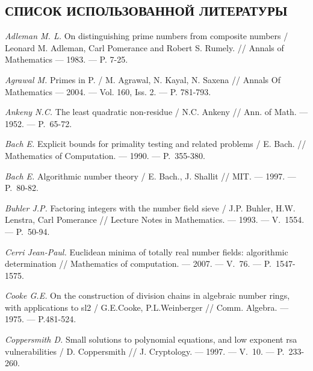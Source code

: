 \newpage
\begin{center}
    \section*{СПИСОК ИСПОЛЬЗОВАННОЙ ЛИТЕРАТУРЫ}
\end{center}

\begin{thebibliography}{99}
\vspace{-12pt}

    \textit{Adleman M. L.} On distinguishing prime numbers from composite numbers / Leonard M. Adleman, Carl Pomerance and Robert S. Rumely. // Annals of Mathematics --- 1983. --- P. 7-25.
    
    \textit{Agrawal M.} Primes in P. / M. Agrawal, N. Kayal, N. Saxena // Annals Of Mathematics --- 2004. --- Vol. 160, Iss. 2. --- P. 781-793.
    
    \textit{Ankeny N.C.} The least quadratic non-residue / N.C. Ankeny // Ann. of Math. --- 1952. --- P.~65-72.

    \textit{Bach E.} Explicit bounds for primality testing and related problems / E. Bach. // Mathematics of Computation. --- 1990. --- P.~355-380.
    
    \textit{Bach E.} Algorithmic number theory / E. Bach., J. Shallit // MIT. --- 1997. --- P.~80-82.
    
    \textit{Buhler J.P.} Factoring integers with the number field sieve / J.P. Buhler, H.W. Lenstra, Carl Pomerance // Lecture Notes in Mathematics. --- 1993. --- V.~1554. --- P.~50-94.

    \textit{Cerri Jean-Paul.} Euclidean minima of totally real number fields: algorithmic determination // Mathematics of computation. --- 2007. --- V.~76. --- {P.}~1547-1575.

    \textit{Cooke G.E.} On the construction of division chains in algebraic number rings, with applications to sl2 / G.E.Cooke, P.L.Weinberger // Comm. Algebra. --- 1975. --- P.481-524.

    \textit{Coppersmith D.} Small solutions to polynomial equations, and low exponent rsa vulnerabilities / D. Coppersmith // J. Cryptology. --- 1997. --- V.~10. --- P.~233-260.


\end{thebibliography}
